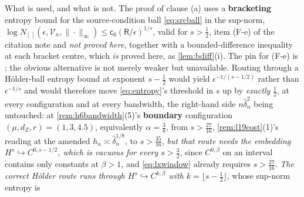 \begin{lemma}
What is used, and what is not. The proof of clause (a) uses a \textbf{bracketing} entropy bound
for the source-condition ball \eqref{eq:srcball} in the sup-norm, 
$\log N_{[\,]}(\epsilon,\mathcal V_n,\|\cdot\|_\infty)\le\mathsf c_6(\mathsf R/\epsilon)^{1/s}$, valid
for $s>\tfrac12$, item (F-e) of the citation note and \emph{not proved here}, together with a
bounded-difference inequality at each bracket centre, which \emph{is} proved here, as
\cref{lem:bdiff}(i). The pin for (F-e) is \citet[Ch.~2]{birman1980}; the obvious alternative
is not merely weaker but unavailable. Routing through a
H\"older-ball entropy bound at exponent $s-\tfrac12$ would yield $\epsilon^{-1/(s-1/2)}$ rather than
$\epsilon^{-1/s}$ and would therefore move \eqref{eq:entropy}'s threshold in $s$ up by \emph{exactly}
$\tfrac12$, at every configuration and at every bandwidth, the right-hand side $n\hat\delta_n^{2}$ being
untouched: at \cref{rem:h6bandwidth}\textup{(5)}'s \textbf{boundary} configuration
$(\mu,d_Z,r)=(1,3,4.5)$, equivalently $\alpha=\tfrac38$, from $s>\tfrac{27}{16}$, 
\cref{rem:l19cost}\textup{(1)}'s reading at the amended $h_u\asymp\hat\delta_n^{1/8}$, to
$s>\tfrac{35}{16}$, \emph{but that route needs the embedding
$H^{s}\hookrightarrow C^{0,s-1/2}$, which is vacuous for
every $s>\tfrac32$}, since $C^{0,\beta}$ on an interval contains only constants at $\beta>1$, and
\eqref{eq:lxwindow} already requires $s>\tfrac{27}{16}$. \emph{The correct H\"older route runs through
$H^{s}\hookrightarrow C^{k,\beta}$ with $k=\lfloor s-\tfrac12\rfloor$}, whose sup-norm entropy is

\end{lemma}
